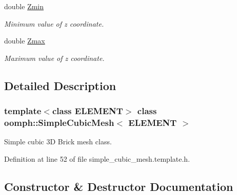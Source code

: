 \begin{DoxyCompactItemize}
double \hyperlink{classoomph_1_1SimpleCubicMesh_af01c08e1e33360eaa2102d0bebb11bcd}{Zmin}
\begin{DoxyCompactList}\small\item\em Minimum value of z coordinate. \end{DoxyCompactList}\item 
double \hyperlink{classoomph_1_1SimpleCubicMesh_aec11ab3ae84b1ba658024d833b7eafbf}{Zmax}
\begin{DoxyCompactList}\small\item\em Maximum value of z coordinate. \end{DoxyCompactList}\end{DoxyCompactItemize}


\subsection{Detailed Description}
\subsubsection*{template$<$class E\+L\+E\+M\+E\+NT$>$\newline
class oomph\+::\+Simple\+Cubic\+Mesh$<$ E\+L\+E\+M\+E\+N\+T $>$}

Simple cubic 3D Brick mesh class. 

Definition at line 52 of file simple\+\_\+cubic\+\_\+mesh.\+template.\+h.



\subsection{Constructor \& Destructor Documentation}
\mbox{\label{classoomph_1_1SimpleCubicMesh_a6732b9fc1cd2e98929158fc300b5b0c7}} 
